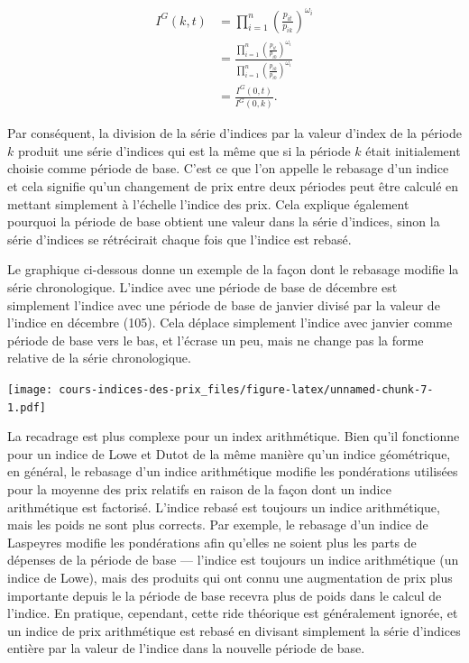 \documentclass[]{article}
\begin{document}
\begin{align*}
I^{G}(k, t) & = \prod_{i = 1}^{n} \left (\frac{p_{it}}{p_{ik}} \right)^{\omega_{i} } \\
& = \frac{\prod_{i = 1}^{n} \left (\frac{p_{it}}{p_{i0}} \right)^{\omega_{i}}}{\prod_{i = 1}^{n} \left (\frac{p_{ik}}{p_{i0}} \right)^{\omega_{i}}} \\
& = \frac{I^{G}(0, t)}{I^{G}(0, k)}.
\end{align*}

Par conséquent, la division de la série d'indices par la valeur d'index de la période \(k\) produit une série d'indices qui est la même que si la période \(k\) était initialement choisie comme période de base. C'est ce que l'on appelle le rebasage d'un indice et cela signifie qu'un changement de prix entre deux périodes peut être calculé en mettant simplement à l'échelle l'indice des prix. Cela explique également pourquoi la période de base obtient une valeur dans la série d'indices, sinon la série d'indices se rétrécirait chaque fois que l'indice est rebasé.

Le graphique ci-dessous donne un exemple de la façon dont le rebasage modifie la série chronologique. L'indice avec une période de base de décembre est simplement l'indice avec une période de base de janvier divisé par la valeur de l'indice en décembre (105). Cela déplace simplement l'indice avec janvier comme période de base vers le bas, et l'écrase un peu, mais ne change pas la forme relative de la série chronologique.

\texttt{[image: cours-indices-des-prix\_files/figure-latex/unnamed-chunk-7-1.pdf]}

La recadrage est plus complexe pour un index arithmétique. Bien qu'il fonctionne pour un indice de Lowe et Dutot de la même manière qu'un indice géométrique, en général, le rebasage d'un indice arithmétique modifie les pondérations utilisées pour la moyenne des prix relatifs en raison de la façon dont un indice arithmétique est factorisé. L'indice rebasé est toujours un indice arithmétique, mais les poids ne sont plus corrects. Par exemple, le rebasage d'un indice de Laspeyres modifie les pondérations afin qu'elles ne soient plus les parts de dépenses de la période de base --- l'indice est toujours un indice arithmétique (un indice de Lowe), mais des produits qui ont connu une augmentation de prix plus importante depuis le la période de base recevra plus de poids dans le calcul de l'indice. En pratique, cependant, cette ride théorique est généralement ignorée, et un indice de prix arithmétique est rebasé en divisant simplement la série d'indices entière par la valeur de l'indice dans la nouvelle période de base.
\end{document}
